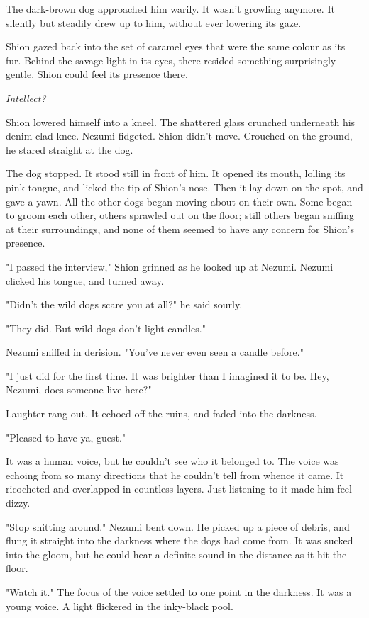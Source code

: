 The dark-brown dog approached him warily. It wasn't growling anymore. It
silently but steadily drew up to him, without ever lowering its gaze.

Shion gazed back into the set of caramel eyes that were the same colour
as its fur. Behind the savage light in its eyes, there resided something
surprisingly gentle. Shion could feel its presence there.

\emph{Intellect?}

Shion lowered himself into a kneel. The shattered glass crunched
underneath his denim-clad knee. Nezumi fidgeted. Shion didn't move.
Crouched on the ground, he stared straight at the dog.

The dog stopped. It stood still in front of him. It opened its mouth,
lolling its pink tongue, and licked the tip of Shion's nose. Then it lay
down on the spot, and gave a yawn. All the other dogs began moving about
on their own. Some began to groom each other, others sprawled out on the
floor; still others began sniffing at their surroundings, and none of
them seemed to have any concern for Shion's presence.

"I passed the interview," Shion grinned as he looked up at Nezumi.
Nezumi clicked his tongue, and turned away.

"Didn't the wild dogs scare you at all?" he said sourly.

"They did. But wild dogs don't light candles."

Nezumi sniffed in derision. "You've never even seen a candle before."

"I just did for the first time. It was brighter than I imagined it to
be. Hey, Nezumi, does someone live here?"

Laughter rang out. It echoed off the ruins, and faded into the darkness.

"Pleased to have ya, guest."

It was a human voice, but he couldn't see who it belonged to. The voice
was echoing from so many directions that he couldn't tell from whence it
came. It ricocheted and overlapped in countless layers. Just listening
to it made him feel dizzy.

"Stop shitting around." Nezumi bent down. He picked up a piece of
debris, and flung it straight into the darkness where the dogs had come
from. It was sucked into the gloom, but he could hear a definite sound
in the distance as it hit the floor.

"Watch it." The focus of the voice settled to one point in the darkness.
It was a young voice. A light flickered in the inky-black pool.

